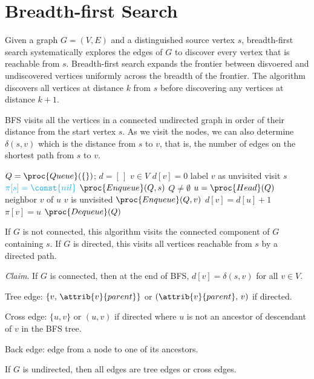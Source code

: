 \section{Breadth-first Search} 

Given a graph $G=(V,E)$ and a distinguished source vertex $s$, breadth-first search systematically explores the edges of $G$ to discover every vertex that is reachable from $s$. Breadth-first search expands the frontier between disvoered and undiscovered vertices uniformly across the breadth of the frontier. The algorithm discovers all vertices at distance $k$ from $s$ before discovering any vertices at distance $k+1$.

BFS visits all the vertices in a connected undirected graph in order of their distance from the start vertex $s$. As we visit the nodes, we can also determine $\delta(s,v)$ which is the distance from $s$ to $v$, that is, the number of edges on the shortest path from $s$ to $v$.

\begin{codebox}
    \li $Q = \proc{Queue}(\{\})$;\; $d = [ \, ]$ 
    \li \For $v \in V$ \Do
        \li $d[v] = 0$ 
        \li label $v$ as unvisited \End
    \li visit $s$
    \li $\color{cyan} \pi[s] = \const{nil}$ 
    \li $\proc{Enqueue}(Q,s)$
    \li \While $Q \neq \emptyset$ \Do
        \li $u = \proc{Head}(Q)$
        \li {} neighbor $v$ of $u$ \Do
            \li \If $v$ is unvisited \Then
                \li $\proc{Enqueue}(Q,v)$
                \li $d[v] = d[u] + 1$
                \li \color{cyan} $\pi[v] = u$  \End
            \End
        \li $\proc{Dequeue}(Q)$
\end{codebox}

If $G$ is not connected, this algorithm visits the connected component of $G$ containing $s$. If $G$ is directed, this visits all vertices reachable from $s$ by a directed path.

\textit{Claim}. If $G$ is connected, then at the end of BFS, $d[v] = \delta(s,v)$ for all $v \in V$.

Tree edge: $\{v,\, \attrib{v}{parent}\}$ or $(\attrib{v}{parent},\, v)$ if directed.

Cross edge: $\{ u,v \}$ or $(u,v)$ if directed where $u$ is not an ancestor of descendant of $v$ in the BFS tree.

Back edge: edge from a node to one of its ancestors.

\begin{lemma}
    If $G$ is undirected, then all edges are tree edges or cross edges.
\end{lemma}

